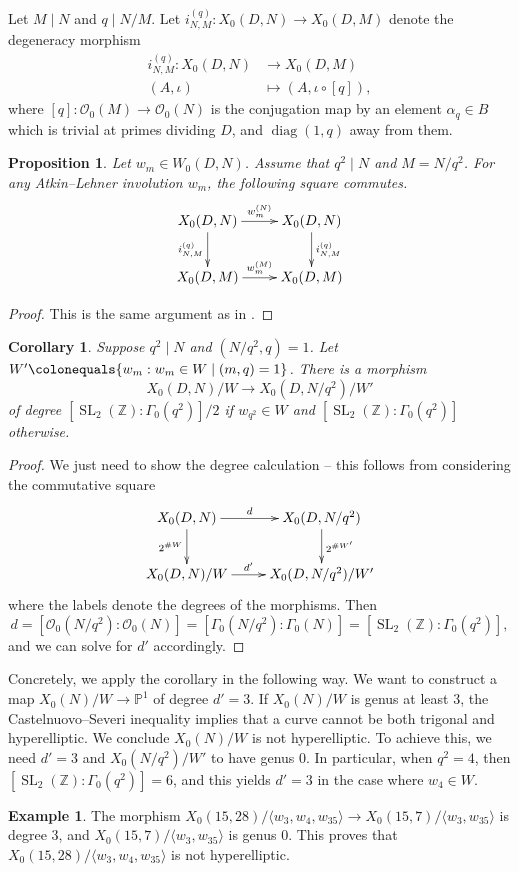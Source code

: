 \documentclass[12pt]{amsart}
\renewcommand{\P}{\mathbb{P}}
\newcommand{\Z}{\mathbb{Z}}
\newcommand{\calO}{\mathcal{O}}
\DeclareMathOperator{\diag}{diag}
\newcommand{\SL}{\operatorname{SL}}
\numberwithin{equation}{subsection}
\theoremstyle{plain}\newtheorem{ithm}{Theorem}
\theoremstyle{plain}\newtheorem{iprop}[ithm]{Proposition}
\newtheorem{corollary}[equation]{Corollary}
\newtheorem{proposition}[equation]{Proposition}
\theoremstyle{definition}
\newtheorem{example}[equation]{Example}
\theoremstyle{remark}
\newcommand{\Order}{\calO} %
\newcommand{\Curve}[2]{X_0({#1},{#2})} %
\newcommand{\ALfull}[2]{W_0({#1},{#2})} %
\begin{document}
Let $M \mid N$ and $q \mid N / M$.
Let  $i^{(q)}_{N,M}:\Curve{D}{N} \to \Curve{D}{M}$  denote the degeneracy morphism
\begin{align*}
	i_{N,M}^{(q)}:\Curve{D}{N} &\to \Curve{D}{M} \\
    (A,\iota) &\mapsto (A, \iota \circ [q]),
	\end{align*}
where $[q] : \Order_0(M) \to \Order_0(N)$ is the conjugation map by an element $\alpha_q \in B$ which is trivial at primes dividing $D$, and $\diag(1,q)$ away from them.
    \begin{proposition}
Let $w_m \in \ALfull{D}{N}$. Assume that $q^2 \mid N$ and $M = N/q^2$. For any Atkin--Lehner involution $w_m$, the following square commutes.
	\[
	\xymatrix{\Curve{D}{N} \ar[r]^-{w_m^{(N)}} \ar[d]_{i_{N,M}^{(q)}} & \Curve{D}{N} \ar[d]^{i_{N,M}^{(q)}} \\
		\Curve{D}{M} \ar[r]^-{w_m^{(M)}} & \Curve{D}{M} }
	\]
        \end{proposition}

\begin{proof}
    This is the same argument as in \cite[Proposition 3.16]{HKLF}.
\end{proof}

\begin{corollary}
\label{ref:cordegeneracy}
Suppose $q^2 \mid N$ and $(N/q^2, q) = 1$. Let $W' \colonequals \{w_m : w_m \in W \mid (m,q) = 1 \}$.
    There is a morphism
    \[ \Curve{D}{N}/W \to \Curve{D}{N/q^2}/W'\]
    of degree $[\SL_2(\Z) : \Gamma_0(q^2)]/2$ if $w_{q^2} \in W$ and $[\SL_2(\Z) : \Gamma_0(q^2)]$ otherwise.
\end{corollary}


\begin{proof}
    We just need to show the degree calculation -- this follows from considering the commutative square
    	\[
	\xymatrix{\Curve{D}{N} \ar[r]^-{d} \ar[d]_{2^{\#W}} & \Curve{D}{N/q^2} \ar[d]^{2^{\#W'}} \\
		\Curve{D}{N}/W \ar[r]^-{d'} & \Curve{D}{N/q^2}/W' }
	\]
    where the labels denote the degrees of the morphisms.
    Then 
    $$
    d = [\Order_0(N/q^2) : \Order_0(N)] = [\Gamma_0(N/q^2) : \Gamma _0(N)] = [\SL_2(\Z) : \Gamma_0(q^2)],$$
    and we can solve for $d'$ accordingly.
\end{proof}


Concretely, we apply the corollary in the following way. We want to construct a map $X_0(N)/W \to \P^1$ of degree $d' = 3$. If $X_0(N)/W$ is genus at least 3, the Castelnuovo--Severi inequality  \cite[Proposition 2.1]{Poonen} implies that a curve cannot be both trigonal and hyperelliptic. We conclude $X_0(N)/W$ is not hyperelliptic.
To achieve this, we need $d' = 3$ and $X_0(N/q^2)/W'$ to have genus 0.
In particular, when $q^2 = 4$, then $[\SL_2(\Z):\Gamma_0(q^2)] = 6$, and this yields $d' =3$ in the case where $w_{4} \in W$. 
\begin{example}
 The morphism $\Curve{15}{28}/\langle w_3, w_4, w_{35} \rangle  \to \Curve{15}{7}/\langle w_3, w_{35} \rangle$ is degree 3, and $  \Curve{15}{7}/\langle w_3, w_{35} \rangle$ is genus 0. This proves that $\Curve{15}{28}/ \langle w_3, w_4, w_{35} \rangle $ is not hyperelliptic.
\end{example}
\end{document}
